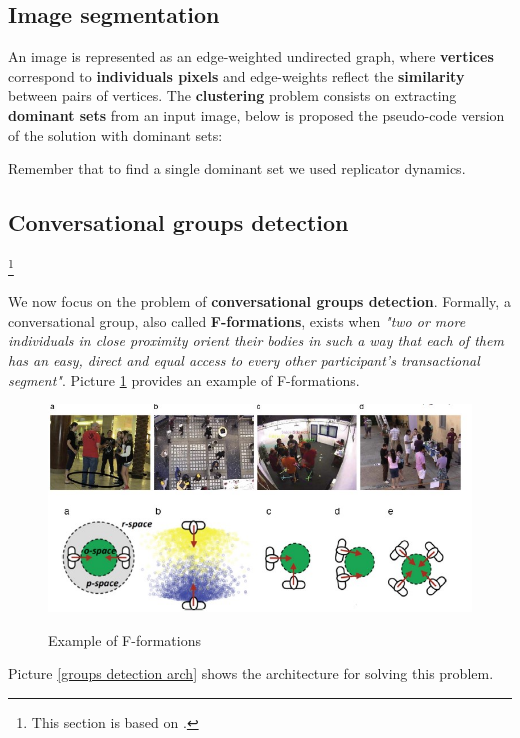 \subsection{Image segmentation}
An image is represented as an edge-weighted undirected graph, where \textbf{vertices} correspond to \textbf{individuals pixels} and edge-weights reflect the \textbf{similarity} between pairs of vertices. The \textbf{clustering} problem consists on extracting \textbf{dominant sets} from an input image, below is proposed the pseudo-code version of the solution with dominant sets:

Remember that to find a single dominant set we used replicator dynamics.

\subsection{Conversational groups detection}
\footnote{This section is based on \cite{vascon2016detecting}.}

We now focus on the problem of \textbf{conversational groups detection}. Formally, a conversational group, also called \textbf{F-formations}, exists when \textit{"two or more individuals in close proximity orient their bodies in such a way that each of them has an easy, direct and equal access to every other participant's transactional segment"}. Picture \ref{f-formations} provides an example of F-formations.

\begin{figure}[h!]
    \centering
    \includegraphics[scale = 1.5]{img/f-formations.jpg}
    \label{f-formations}
    \caption{Example of F-formations}
\end{figure}


Picture \ref{groups detection arch} shows the architecture for solving this problem.

